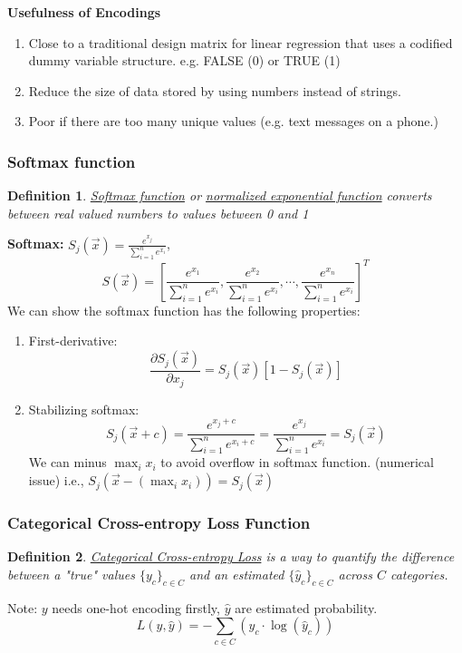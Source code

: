 \documentclass[11pt,a4paper]{article}
\newtheorem{definition}{Definition}
\begin{document}
\textbf{Usefulness of Encodings}
\begin{enumerate}
    \item Close to a traditional design matrix for linear regression that uses a codified dummy variable structure. e.g. FALSE (0) or TRUE (1)
    \item Reduce the size of data stored by using numbers instead of
    strings.
    \item Poor if there are too many unique values (e.g. text messages on a phone.)
\end{enumerate}




\subsubsection{Softmax function}
\begin{definition}
    \underline{Softmax function} or \underline{normalized exponential function} converts between real valued numbers to values between 0 and 1
\end{definition}
\textbf{Softmax:} $S_j(\vec{x})=\frac{e^{x_j}}{\sum_{i=1}^ne^{x_i}}$, $$S(\vec{x})=\left[\frac{e^{x_1}}{\sum_{i=1}^ne^{x_i}},\frac{e^{x_2}}{\sum_{i=1}^ne^{x_i}},\cdots, \frac{e^{x_n}}{\sum_{i=1}^ne^{x_i}}\right]^T$$
We can show the softmax function has the following properties:
\begin{enumerate}[(1)]
    \item First-derivative: $$\frac{\partial S_j(\vec{x})}{\partial x_j}=S_j(\vec{x})[1-S_j(\vec{x})]$$
    \item Stabilizing softmax: $$S_j(\vec{x}+c)=\frac{e^{x_j+c}}{\sum_{i=1}^ne^{x_i+c}}=\frac{e^{x_j}}{\sum_{i=1}^ne^{x_i}}=S_j(\vec{x})$$
    We can minus $\max_{i} x_i$ to avoid overflow in softmax function. (numerical issue) i.e., $S_j(\vec{x}-(\max_{i} x_i))=S_j(\vec{x})$
\end{enumerate}

\subsubsection{Categorical Cross-entropy Loss Function}
\begin{definition}
    \underline{Categorical Cross-entropy Loss} is a way to quantify the difference between a "true" values $\{y_c\}_{c\in C}$ and an estimated $\{\hat{y}_c\}_{c\in C}$ across $C$ categories.
\end{definition}
Note: $y$ needs one-hot encoding firstly, $\hat{y}$ are estimated probability.
$$L(y,\hat{y})=-\sum_{c\in C}\left(y_c\cdot \log(\hat{y}_c)\right)$$
\end{document}

